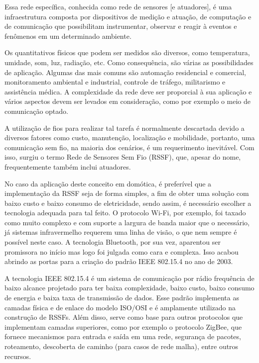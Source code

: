 \documentclass[
    12pt,               %
    a4paper,            %
    english,            %
    brazil,             %
    ]{article}
\begin{document}
Essa rede específica, conhecida como rede de sensores [e atuadores], é uma infraestrutura composta por dispositivos de medição e
atuação, de computação e de comunicação que possibilitam instrumentar, observar e reagir à eventos e fenômenos em um determinado
ambiente. \cite{sohraby_minoli_znati2007}

Os quantitativos físicos que podem ser medidos são diversos, como temperatura, umidade, som, luz, radiação, etc. Como
consequência, são várias as possibilidades de aplicação. Algumas das mais comuns são automação residencial e comercial,
monitoramento ambiental e industrial, controle de tráfego, militarismo e assistência médica. A complexidade da rede deve ser
proporcial à sua aplicação e vários aspectos devem ser levados em consideração, como por exemplo o meio de comunicação optado.
\cite{kuorilehto2007}

A utilização de fios para realizar tal tarefa é normalmente descartada devido a diversos fatores como custo, manutenção,
localização e mobilidade, portanto, uma comunicação sem fio, na maioria dos cenários, é um requerimento inevitável. Com isso,
surgiu o termo Rede de Sensores Sem Fio (RSSF), que, apesar do nome, frequentemente também inclui atuadores.
\cite{karl_willig2005}

No caso da aplicação deste conceito em domótica, é preferível que a implementação da RSSF seja de forma simples, a fim de obter
uma solução com baixo custo e baixo consumo de eletricidade, sendo assim, é necessário escolher a tecnologia adequada para tal
feito. O protocolo Wi-Fi, por exemplo, foi taxado como muito complexo e com suporte a largura de banda maior que o necessário, já
sistemas infravermelho requerem uma linha de visão, o que nem sempre é possível neste caso. A tecnologia Bluetooth, por sua vez,
aparentou ser promissora no início mas logo foi julgada como cara e complexa. Isso acabou abrindo as portas para a criação do
padrão IEEE 802.15.4 no ano de 2003.  \cite{sohraby_minoli_znati2007}

A tecnologia IEEE 802.15.4 é um sistema de comunicação por rádio frequência de baixo alcance projetado para ter baixa
complexidade, baixo custo, baixo consumo de energia e baixa taxa de transmissão de dados. Esse padrão implementa as camadas física
e de enlace do modelo ISO/OSI e é amplamente utilizado na construção de RSSFs. Além disso, serve como base para outros protocolos
que implementam camadas superiores, como por exemplo o protocolo ZigBee, que fornece mecanismos para entrada e saída em uma rede,
segurança de pacotes, roteamento, descoberta de caminho (para casos de rede malha), entre outros recursos. \cite{buratti2011}
\end{document}
